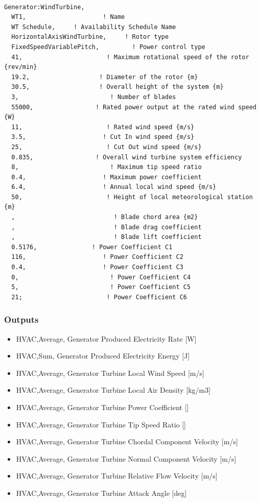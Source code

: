 \begin{lstlisting}

Generator:WindTurbine,
  WT1,                     ! Name
  WT Schedule,     ! Availability Schedule Name
  HorizontalAxisWindTurbine,     ! Rotor type
  FixedSpeedVariablePitch,         ! Power control type
  41,                       ! Maximum rotational speed of the rotor {rev/min}
  19.2,                   ! Diameter of the rotor {m}
  30.5,                   ! Overall height of the system {m}
  3,                         ! Number of blades
  55000,                 ! Rated power output at the rated wind speed {W}
  11,                       ! Rated wind speed {m/s}
  3.5,                     ! Cut In wind speed {m/s}
  25,                       ! Cut Out wind speed {m/s}
  0.835,                 ! Overall wind turbine system efficiency
  8,                         ! Maximum tip speed ratio
  0.4,                     ! Maximum power coefficient
  6.4,                     ! Annual local wind speed {m/s}
  50,                       ! Height of local meteorological station {m}
  ,                           ! Blade chord area {m2}
  ,                           ! Blade drag coefficient
  ,                           ! Blade lift coefficient
  0.5176,               ! Power Coefficient C1
  116,                     ! Power Coefficient C2
  0.4,                     ! Power Coefficient C3
  0,                         ! Power Coefficient C4
  5,                         ! Power Coefficient C5
  21;                       ! Power Coefficient C6
\end{lstlisting}

\subsubsection{Outputs}\label{outputs-12-001}

\begin{itemize}
\item
  HVAC,Average, Generator Produced Electricity Rate {[}W{]}
\item
  HVAC,Sum, Generator Produced Electricity Energy {[}J{]}
\item
  HVAC,Average, Generator Turbine Local Wind Speed {[}m/s{]}
\item
  HVAC,Average, Generator Turbine Local Air Density {[}kg/m3{]}
\item
  HVAC,Average, Generator Turbine Power Coefficient {[]}
\item
  HVAC,Average, Generator Turbine Tip Speed Ratio {[]}
\item
  HVAC,Average, Generator Turbine Chordal Component Velocity {[}m/s{]}
\item
  HVAC,Average, Generator Turbine Normal Component Velocity {[}m/s{]}
\item
  HVAC,Average, Generator Turbine Relative Flow Velocity {[}m/s{]}
\item
  HVAC,Average, Generator Turbine Attack Angle {[}deg{]}
\end{itemize}

